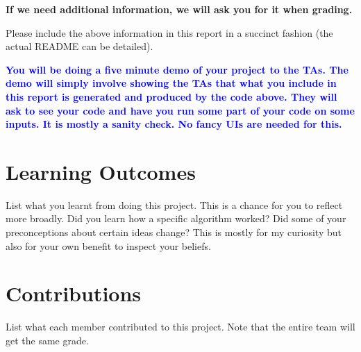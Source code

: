 \documentclass[11pt,a4paper]{article}
\begin{document}
\textbf{If we need additional information, we will ask you for it when grading.}

Please include the above information in this report in a succinct fashion (the actual README can be detailed).

\textcolor{blue}{\textbf{You will be doing a five minute demo of your project to the TAs. The demo will simply involve showing the TAs that what you include in this report is generated and produced by the code above. They will ask to see your code and have you run some part of your code on some inputs. It is mostly a sanity check. No fancy UIs are needed for this. }}

\section{Learning Outcomes}
List what you learnt from doing this project. This is a chance for you to reflect more broadly. Did you learn how a specific algorithm worked? Did some of your preconceptions about certain ideas change? This is mostly for my curiosity but also for your own benefit to inspect your beliefs.

\section{Contributions}
List what each member contributed to this project. Note that the entire team will get the same grade.
\end{document}
